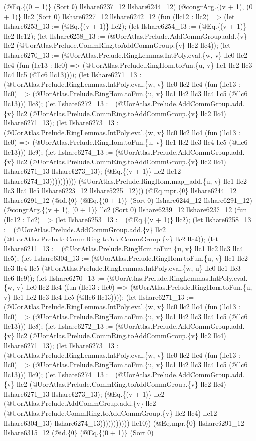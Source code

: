 \documentclass[11pt]{article}
\begin{document}
(@Eq.\{(0 + 1)\} (Sort 0) llshare6237\_12 llshare6244\_12) (@congrArg.\{(v + 1), (0 + 1)\} llc2 (Sort 0) llshare6227\_12 llshare6242\_12 (fun (llc12 : llc2) => (let llshare6253\_13 := (@Eq.\{(v + 1)\} llc2); (let llshare6254\_13 := (@Eq.\{(v + 1)\} llc2 llc12); (let llshare6258\_13 := (@UorAtlas.Prelude.AddCommGroup.add.\{v\} llc2 (@UorAtlas.Prelude.CommRing.toAddCommGroup.\{v\} llc2 llc4)); (let llshare6270\_13 := (@UorAtlas.Prelude.RingLemmas.IntPoly.eval.\{w, v\} llc0 llc2 llc4 (fun (llc13 : llc0) => (@UorAtlas.Prelude.RingHom.toFun.\{u, v\} llc1 llc2 llc3 llc4 llc5 (@llc6 llc13)))); (let llshare6271\_13 := (@UorAtlas.Prelude.RingLemmas.IntPoly.eval.\{w, v\} llc0 llc2 llc4 (fun (llc13 : llc0) => (@UorAtlas.Prelude.RingHom.toFun.\{u, v\} llc1 llc2 llc3 llc4 llc5 (@llc6 llc13))) llc8); (let llshare6272\_13 := (@UorAtlas.Prelude.AddCommGroup.add.\{v\} llc2 (@UorAtlas.Prelude.CommRing.toAddCommGroup.\{v\} llc2 llc4) llshare6271\_13); (let llshare6273\_13 := (@UorAtlas.Prelude.RingLemmas.IntPoly.eval.\{w, v\} llc0 llc2 llc4 (fun (llc13 : llc0) => (@UorAtlas.Prelude.RingHom.toFun.\{u, v\} llc1 llc2 llc3 llc4 llc5 (@llc6 llc13))) llc9); (let llshare6274\_13 := (@UorAtlas.Prelude.AddCommGroup.add.\{v\} llc2 (@UorAtlas.Prelude.CommRing.toAddCommGroup.\{v\} llc2 llc4) llshare6271\_13 llshare6273\_13); (@Eq.\{(v + 1)\} llc2 llc12 llshare6274\_13)))))))))) (@UorAtlas.Prelude.RingHom.map\_add.\{u, v\} llc1 llc2 llc3 llc4 llc5 llshare6223\_12 llshare6225\_12))) (@Eq.mpr.\{0\} llshare6244\_12 llshare6291\_12 (@id.\{0\} (@Eq.\{(0 + 1)\} (Sort 0) llshare6244\_12 llshare6291\_12) (@congrArg.\{(v + 1), (0 + 1)\} llc2 (Sort 0) llshare6239\_12 llshare6233\_12 (fun (llc12 : llc2) => (let llshare6253\_13 := (@Eq.\{(v + 1)\} llc2); (let llshare6258\_13 := (@UorAtlas.Prelude.AddCommGroup.add.\{v\} llc2 (@UorAtlas.Prelude.CommRing.toAddCommGroup.\{v\} llc2 llc4)); (let llshare6211\_13 := (@UorAtlas.Prelude.RingHom.toFun.\{u, v\} llc1 llc2 llc3 llc4 llc5); (let llshare6304\_13 := (@UorAtlas.Prelude.RingHom.toFun.\{u, v\} llc1 llc2 llc3 llc4 llc5 (@UorAtlas.Prelude.RingLemmas.IntPoly.eval.\{w, u\} llc0 llc1 llc3 llc6 llc9)); (let llshare6270\_13 := (@UorAtlas.Prelude.RingLemmas.IntPoly.eval.\{w, v\} llc0 llc2 llc4 (fun (llc13 : llc0) => (@UorAtlas.Prelude.RingHom.toFun.\{u, v\} llc1 llc2 llc3 llc4 llc5 (@llc6 llc13)))); (let llshare6271\_13 := (@UorAtlas.Prelude.RingLemmas.IntPoly.eval.\{w, v\} llc0 llc2 llc4 (fun (llc13 : llc0) => (@UorAtlas.Prelude.RingHom.toFun.\{u, v\} llc1 llc2 llc3 llc4 llc5 (@llc6 llc13))) llc8); (let llshare6272\_13 := (@UorAtlas.Prelude.AddCommGroup.add.\{v\} llc2 (@UorAtlas.Prelude.CommRing.toAddCommGroup.\{v\} llc2 llc4) llshare6271\_13); (let llshare6273\_13 := (@UorAtlas.Prelude.RingLemmas.IntPoly.eval.\{w, v\} llc0 llc2 llc4 (fun (llc13 : llc0) => (@UorAtlas.Prelude.RingHom.toFun.\{u, v\} llc1 llc2 llc3 llc4 llc5 (@llc6 llc13))) llc9); (let llshare6274\_13 := (@UorAtlas.Prelude.AddCommGroup.add.\{v\} llc2 (@UorAtlas.Prelude.CommRing.toAddCommGroup.\{v\} llc2 llc4) llshare6271\_13 llshare6273\_13); (@Eq.\{(v + 1)\} llc2 (@UorAtlas.Prelude.AddCommGroup.add.\{v\} llc2 (@UorAtlas.Prelude.CommRing.toAddCommGroup.\{v\} llc2 llc4) llc12 llshare6304\_13) llshare6274\_13))))))))))) llc10)) (@Eq.mpr.\{0\} llshare6291\_12 llshare6315\_12 (@id.\{0\} (@Eq.\{(0 + 1)\} (Sort 0) 
\end{document}
